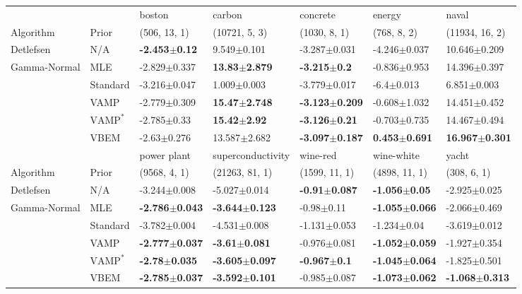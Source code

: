 \begin{tabular}{lllllll}
\toprule
             &      &                    boston &                    carbon &                   concrete &                    energy &                      naval \\
Algorithm & Prior& (506, 13, 1)& (10721, 5, 3)& (1030, 8, 1)& (768, 8, 2)& (11934, 16, 2)\\
\midrule
Detlefsen & N/A &  \textbf{-2.453$\pm$0.12} &           9.549$\pm$0.101 &           -3.287$\pm$0.031 &          -4.246$\pm$0.037 &           10.646$\pm$0.209 \\
Gamma-Normal & MLE &          -2.829$\pm$0.337 &  \textbf{13.83$\pm$2.879} &    \textbf{-3.215$\pm$0.2} &          -0.836$\pm$0.953 &           14.396$\pm$0.397 \\
             & Standard &          -3.216$\pm$0.047 &           1.009$\pm$0.003 &           -3.779$\pm$0.017 &            -6.4$\pm$0.013 &            6.851$\pm$0.003 \\
             & VAMP &          -2.779$\pm$0.309 &  \textbf{15.47$\pm$2.748} &  \textbf{-3.123$\pm$0.209} &          -0.608$\pm$1.032 &           14.451$\pm$0.452 \\
             & $\text{VAMP}^*$ &           -2.785$\pm$0.33 &   \textbf{15.42$\pm$2.92} &   \textbf{-3.126$\pm$0.21} &          -0.703$\pm$0.735 &           14.467$\pm$0.494 \\
             & VBEM &           -2.63$\pm$0.276 &          13.587$\pm$2.682 &  \textbf{-3.097$\pm$0.187} &  \textbf{0.453$\pm$0.691} &  \textbf{16.967$\pm$0.301} \\
\midrule
             &      &                power plant &          superconductivity &                  wine-red &                 wine-white &                      yacht \\
Algorithm & Prior& (9568, 4, 1)& (21263, 81, 1)& (1599, 11, 1)& (4898, 11, 1)& (308, 6, 1)\\
\midrule
Detlefsen & N/A &           -3.244$\pm$0.008 &           -5.027$\pm$0.014 &  \textbf{-0.91$\pm$0.087} &   \textbf{-1.056$\pm$0.05} &           -2.925$\pm$0.025 \\
Gamma-Normal & MLE &  \textbf{-2.786$\pm$0.043} &  \textbf{-3.644$\pm$0.123} &            -0.98$\pm$0.11 &  \textbf{-1.055$\pm$0.066} &           -2.066$\pm$0.469 \\
             & Standard &           -3.782$\pm$0.004 &           -4.531$\pm$0.008 &          -1.131$\pm$0.053 &            -1.234$\pm$0.04 &           -3.619$\pm$0.012 \\
             & VAMP &  \textbf{-2.777$\pm$0.037} &   \textbf{-3.61$\pm$0.081} &          -0.976$\pm$0.081 &  \textbf{-1.052$\pm$0.059} &           -1.927$\pm$0.354 \\
             & $\text{VAMP}^*$ &   \textbf{-2.78$\pm$0.035} &  \textbf{-3.605$\pm$0.097} &   \textbf{-0.967$\pm$0.1} &  \textbf{-1.045$\pm$0.064} &           -1.825$\pm$0.501 \\
             & VBEM &  \textbf{-2.785$\pm$0.037} &  \textbf{-3.592$\pm$0.101} &          -0.985$\pm$0.087 &  \textbf{-1.073$\pm$0.062} &  \textbf{-1.068$\pm$0.313} \\
\bottomrule
\end{tabular}


